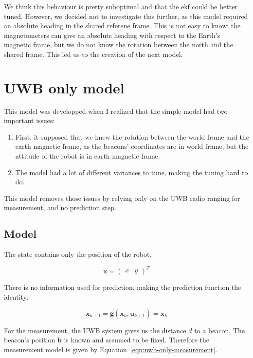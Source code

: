 \documentclass[a4paper, 12pt]{scrreprt}
\begin{document}
We think this behaviour is pretty suboptimal and that the \gls{ekf} could be better tuned.
However, we decided not to investigate this further, as this model required an absolute heading in the shared referene frame.
This is not easy to know: the magnetometers can give an absolute heading with respect to the Earth's magnetic frame, but we do not know the rotation between the north and the shared frame.
This led us to the creation of the next model.

\section{UWB only model}

This model was developped when I realized that the simple model had two important issues:

\begin{enumerate}
\item First, it supposed that we knew the rotation between the world frame and the earth magnetic frame, as the beacons' coordinates are in world frame, but the attitude of the robot is in earth magnetic frame.
\item The model had a lot of different variances to tune, making the tuning hard to do.
\end{enumerate}

This model removes those issues by relying only on the UWB radio ranging for measurement, and no prediction step.

\subsection{Model}

The state contains only the position of the robot.

\begin{equation*}
\mathbf{x} = \begin{pmatrix}x & y\end{pmatrix}^T
\end{equation*}


There is no information used for prediction, making the prediction function the identity:

\begin{equation}
    \mathbf{x}_{k+1} = \mathbf{g}(\mathbf{x}_k, \mathbf{u}_{k+1}) = \mathbf{x}_{k}
\end{equation}

For the measurement, the UWB system gives us the distance $d$ to a beacon.
The beacon's position $\mathbf{b}$ is known and assumed to be fixed.
Therefore the measurement model is given by Equation~\ref{eqn:uwb-only-measurement}.
\end{document}
